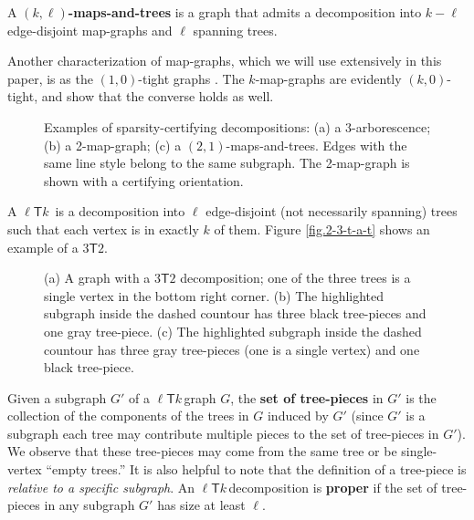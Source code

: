 \documentclass[Svgc,nospthms]{Svgc}
\newcommand{\ellteekay}{\ensuremath{\ell{\mathsf T}k}\,}
\newcommand{\reffig}[1]{Figure \ref{fig.#1}}
\begin{document}
	
	A {\bf $(k,\ell)$-maps-and-trees} is a graph that admits a decomposition into $k-\ell$ 
	edge-disjoint map-graphs and $\ell$ spanning trees.
	
Another characterization of map-graphs, which we will use extensively in this paper, is as the $(1,0)$-tight graphs \cite{whiteley:union-matroids,maps}. The $k$-map-graphs are evidently $(k,0)$-tight, and \cite{whiteley:union-matroids,maps} show that the converse holds as well. 

\begin{figure}[htbp]
	\centering
	\hspace{.3in}
	\hspace{.3 in}
	\caption{Examples of sparsity-certifying decompositions: (a) a $3$-arborescence; (b) a 2-map-graph;  (c)  a $(2,1)$-maps-and-trees.  Edges with the same line style belong to the 
	same subgraph.  The 2-map-graph is shown with a certifying orientation.}
	\end{figure}





A \ellteekay 
is a decomposition into $\ell$ edge-disjoint (not necessarily spanning) trees such that each vertex is in 
exactly $k$ of them.  \reffig{2-3-t-a-t} shows an example of a $3{\mathsf T}2$.

\begin{figure}[htbp]
	\centering
	\subfigure[]{\texttt{[image: 2-3-t-a-t]}\label{fig.2-3-t-a-t}}
	\subfigure[]{\texttt{[image: 2-3-t-a-t-b]}\label{fig.2-3-t-a-t-b}}
	\subfigure[]{\texttt{[image: 2-3-t-a-t-c]}\label{fig.2-3-t-a-t-c}}
	\caption{(a) A graph with a $3\mathsf{T}2$ decomposition; one of the three trees is 
	a single vertex in the bottom right corner.  (b) The highlighted subgraph inside the dashed 
	countour has three black tree-pieces and one gray tree-piece.  (c) The highlighted subgraph inside 
	the dashed countour	has three gray tree-pieces (one is a single vertex) and one black tree-piece.}
	\end{figure}

	Given a subgraph $G'$ of a \ellteekay graph $G$, the {\bf set of tree-pieces} in $G'$ is 
	the collection of the components of the trees in $G$ induced by $G'$ (since $G'$
	is a subgraph each tree may contribute multiple pieces to the set of tree-pieces in $G'$). 
	We observe that these tree-pieces may come from the same tree or be single-vertex ``empty trees.'' 
	It is also helpful to note that the definition of a tree-piece is {\it relative to a specific 
	subgraph}.  An \ellteekay decomposition is \textbf{proper} if the set of tree-pieces in any 
	subgraph $G'$ has size at least $\ell$.
	
\end{document}
